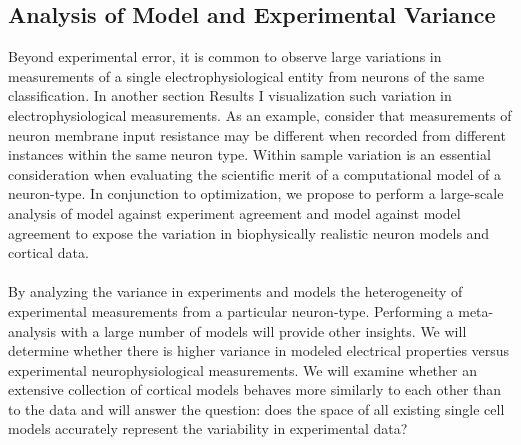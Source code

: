 \subsection{Analysis of Model and Experimental Variance}
Beyond experimental error, it is common to observe large variations in measurements of a single electrophysiological entity from neurons of the same classification. In another section %
Results I visualization such variation in electrophysiological measurements. As an example, consider that measurements of neuron membrane input resistance may be different when recorded from different instances within the same neuron type. Within sample variation is an essential consideration when evaluating the scientific merit of a computational model of a neuron-type. In conjunction to optimization, we propose to perform a large-scale analysis of model against experiment agreement and model against model agreement to expose the variation in biophysically realistic neuron models and cortical data.\\
\\
By analyzing the variance in experiments and models the heterogeneity of experimental measurements from a particular neuron-type. Performing a meta-analysis with a large number of models will provide other insights. We will determine whether there is higher variance in modeled electrical properties versus experimental neurophysiological measurements. We will examine whether an extensive collection of cortical models behaves more similarly to each other than to the data and will answer the question: does the space of all existing single cell models accurately represent the variability in experimental data?\\
\newline
